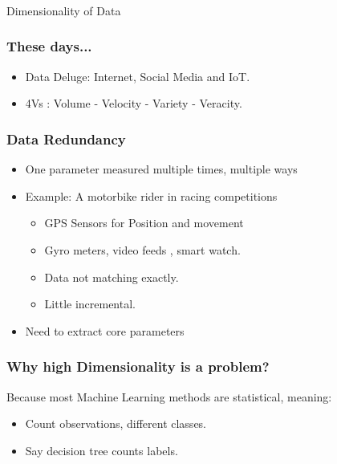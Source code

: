 \begin{frame}[fragile]\frametitle{}
\begin{center}
{\Large Dimensionality of Data}
\end{center}
\end{frame}


\begin{frame}[fragile]\frametitle{These days...}
	\begin{itemize}
	\item Data Deluge: Internet, Social Media and IoT. 
	\item 4Vs : Volume - Velocity - Variety - Veracity. 
	\end{itemize}
\end{frame}

\begin{frame}[fragile]\frametitle{Data Redundancy}
	\begin{itemize}
	\item One parameter measured multiple times, multiple ways
	\item Example: A motorbike rider in racing competitions
	\begin{itemize}
	\item GPS Sensors for Position and movement
	\item Gyro meters,  video feeds , smart watch. 
	\item Data not matching exactly.
	\item Little incremental. 
	\end{itemize}
	\item Need to extract core parameters
	\end{itemize}
\end{frame}

\begin{frame}[fragile]\frametitle{Why high Dimensionality is a problem? }
Because most Machine Learning methods are statistical, meaning:
	\begin{itemize}
	\item Count observations, different classes. 
	\item Say decision tree counts labels.
	\end{itemize}
\end{frame}

